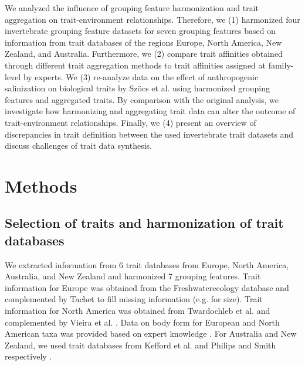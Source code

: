 \documentclass{article}
\begin{document}
We analyzed the influence of grouping feature harmonization and trait aggregation on trait-environment relationships. 
Therefore, we (1) harmonized four invertebrate grouping feature datasets for seven grouping features based on information from trait databases of the regions Europe, North America, New Zealand, and Australia. Furthermore, we (2) compare trait affinities obtained through different trait aggregation methods to trait affinities assigned at family-level by experts. We (3) re-analyze data on the effect of anthropogenic salinization on biological traits by Szöcs et al. \cite{szocs_effects_2014} using harmonized grouping features and aggregated traits. By comparison with the original analysis, we investigate how harmonizing and aggregating trait data can alter the outcome of trait-environment relationships. Finally, we (4) present an overview of discrepancies in trait definition between the used invertebrate trait datasets and discuss challenges of trait data synthesis.

\newpage


\section*{Methods}

\subsection*{Selection of traits and harmonization of trait databases}

We extracted information from 6 trait databases from Europe, North America, Australia, and New Zealand and harmonized 7 grouping features. Trait information for Europe was obtained from the Freshwaterecology database \cite{schmidt-kloiber_www.freshwaterecology.info_2015} and complemented by Tachet \cite{usseglio-polatera_biomonitoring_2000} to fill missing information (e.g. for size).
Trait information for North America was obtained from Twardochleb et al. \cite{twardochleb_trait_data_2020} and complemented by Vieira et al. \cite{vieira_database_nodate}. Data on body form for European and North American taxa was provided based on expert knowledge \cite{polatera_personal_information_2020}. For Australia and New Zealand, we used trait databases from Kefford et al. \cite{kefford_integrated_2020} and Philips and Smith respectively \cite{Philips_and_Smith_NZ_DB_2018}.
\end{document}
